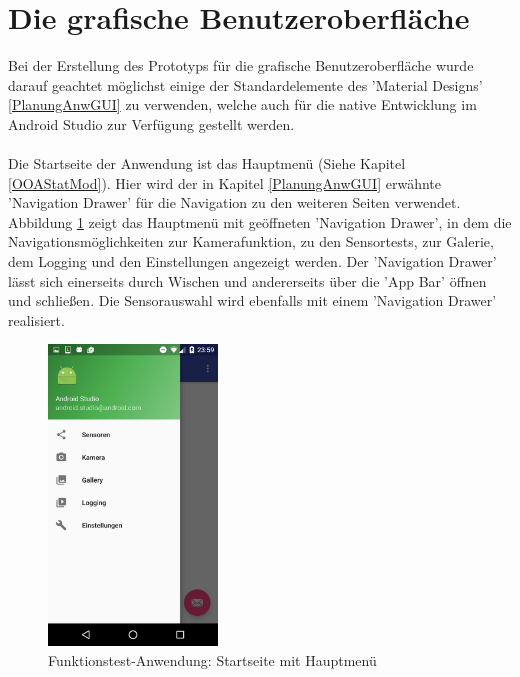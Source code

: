 \section{Die grafische Benutzeroberfläche} \label{OOAOODGUI}

Bei der Erstellung des Prototyps für die grafische Benutzeroberfläche wurde darauf geachtet möglichst einige der Standardelemente des 'Material Designs' \ref{PlanungAnwGUI} zu verwenden, welche auch für die native Entwicklung im Android Studio zur Verfügung gestellt werden.
\\
\\
Die Startseite der Anwendung ist das Hauptmenü (Siehe Kapitel \ref{OOAStatMod}). Hier wird der in Kapitel \ref{PlanungAnwGUI} erwähnte 'Navigation Drawer' für die Navigation zu den weiteren Seiten verwendet. Abbildung \ref{fig:Main_Menu} zeigt das Hauptmenü mit geöffneten 'Navigation Drawer', in dem die Navigationsmöglichkeiten zur Kamerafunktion, zu den Sensortests, zur Galerie, dem Logging und den Einstellungen angezeigt werden. Der 'Navigation Drawer' lässt sich einerseits durch Wischen und andererseits über die 'App Bar' öffnen und schließen. Die Sensorauswahl wird ebenfalls mit einem 'Navigation Drawer' realisiert.

\begin{figure}[h]
	\centering
	\includegraphics[width=0.4\textwidth]{Bilder/Screenshots/Screenshot_20170214-235908.PNG}
	\caption{Funktionstest-Anwendung: Startseite mit Hauptmenü}
	\label{fig:Main_Menu}
\end{figure}

